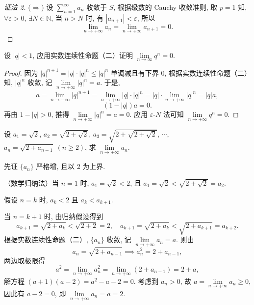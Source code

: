 \begin{proof}[证法 2]
($\Longrightarrow$) 设 $\sum\limits_{n=1}^{\infty}a_{n}$ 收敛于 $S$, 根据级数的 Cauchy 收敛准则, 取 $p=1$ 知, $\forall\varepsilon>0$, $\exists N\in\mathbb{N}$, 当 $n>N$ 时, 有 $|a_{n+1}|<\varepsilon$, 所以
\[
\lim_{n\to+\infty}a_{n} = \lim_{n\to+\infty}a_{n+1} = 0.
\]
\end{proof}

\begin{example}\label{ex:1.4.3}
设 $|q|<1$, 应用实数连续性命题（二）证明 $\lim\limits_{n\to\infty}q^{n} = 0$.
\end{example}

\begin{proof}
因为 $|q|^{n+1} = |q|\cdot|q|^{n} \leqslant |q|^{n}$ 单调减且有下界 0, 根据实数连续性命题（二）知, $|q|^{n}$ 收敛, 记 $\lim\limits_{n\to+\infty}|q|^n = a$. 于是,
\[
a = \lim_{n\to+\infty}|q|^{n+1} = \lim_{n\to+\infty}|q|\cdot|q|^{n} = |q|\cdot\lim_{n\to+\infty}|q|^{n} = |q| a,
\]
\[
(1 - |q|)a = 0.
\]
再由 $1 - |q| > 0$, 推得 $\lim\limits_{n\to+\infty}|q|^{n} = a = 0$. 应用 $\varepsilon\text{-}N$ 法可知 $\lim\limits_{n\to+\infty}q^n = 0$.
\end{proof}

\begin{example}\label{ex:1.4.4}
设 $a_{1} = \sqrt{2}$, $a_{2} = \sqrt{2+\sqrt{2}}$, $a_{3} = \sqrt{2+\sqrt{2+\sqrt{2}}}$, $\cdots$, $a_{n} = \sqrt{2+a_{n-1}}\;(n\geqslant2)$, 求 $\lim\limits_{n\to+\infty}a_n$.
\end{example}

\begin{solution}
先证 $\{a_{n}\}$ 严格增, 且以 2 为上界.

（数学归纳法）当 $n=1$ 时, $a_{1} = \sqrt{2} < 2$, 且 $a_{1} = \sqrt{2} < \sqrt{2+\sqrt{2}} = a_{2}$.

假设 $n=k$ 时, $a_{k} < 2$ 且 $a_{k} < a_{k+1}$.

当 $n=k+1$ 时, 由归纳假设得到
\[
a_{k+1} = \sqrt{2+a_{k}} < \sqrt{2+2} = 2,\quad a_{k+1} = \sqrt{2+a_{k}} < \sqrt{2+a_{k+1}} = a_{k+2}.
\]
根据实数连续性命题（二）, $\{a_{n}\}$ 收敛, 记 $\lim\limits_{n\to+\infty} a_{n} = a$. 则由
\[
a_{n} = \sqrt{2+a_{n-1}} \implies a_{n}^{2} = 2 + a_{n-1},
\]
两边取极限得
\[
a^{2} = \lim_{n\to+\infty}a_{n}^{2} = \lim_{n\to+\infty}(2 + a_{n-1}) = 2 + a,
\]
解方程 $(a+1)(a-2) = a^{2} - a - 2 = 0$. 考虑到 $a_{n}>0$, 故 $a = \lim\limits_{n\to+\infty}a_n \geqslant 0$, 因此有 $a - 2 = 0$, 即 $\lim\limits_{n\to+\infty}a_n = a = 2$.
\end{solution}

